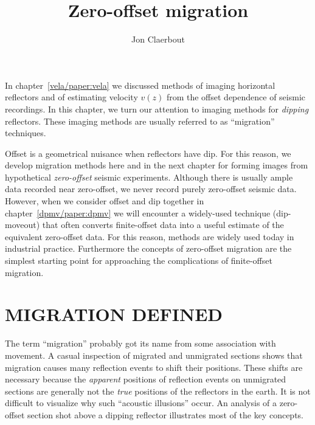 \def\CAKEDIR{.}

\title{Zero-offset migration}
\author{Jon Claerbout}
\maketitle
\label{paper:krch}


\par
In chapter~\ref{vela/paper:vela} we discussed
methods of imaging horizontal reflectors
and of estimating velocity $v(z)$
from the offset dependence of seismic recordings.
In this chapter,
we turn our attention to imaging methods for {\em dipping} reflectors.
These imaging methods
are usually referred to as ``migration'' techniques.   

\par
Offset is a geometrical nuisance when reflectors have dip.
For this reason,
we develop migration methods here and in the next chapter
for forming images from hypothetical 
{\em zero-offset} seismic experiments.  
Although there is usually ample data recorded near zero-offset,
we never record purely zero-offset seismic data.
However, when we 
consider offset and dip together in chapter~\ref{dpmv/paper:dpmv} we will encounter
a widely-used technique (dip-moveout) that often 
converts finite-offset data into a useful estimate of the equivalent 
zero-offset data.
For this reason,
methods are widely used today in industrial practice.
Furthermore the concepts of zero-offset migration
are the simplest starting point for approaching
the complications of finite-offset migration.

\section{MIGRATION DEFINED}
\par
The term ``migration'' probably got its name
from some association with movement.
A casual inspection of migrated and unmigrated sections
shows that migration causes many reflection events
to shift their positions.
These shifts are necessary because the {\em apparent} positions
of reflection events on unmigrated sections are generally not the {\em true}
positions of the reflectors in the earth.
It is not difficult to visualize why such ``acoustic illusions'' occur.
An analysis of a zero-offset section
shot above a dipping reflector illustrates most of the key concepts.


